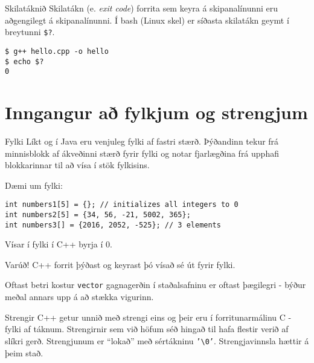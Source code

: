 \documentclass[handout]{beamer}
\begin{document}
\begin{frame}[fragile]{Skilatáknið}
Skilatákn (e. \emph{exit code}) forrita sem keyra á skipanalínunni eru aðgengilegt á skipanalínunni. Í bash (Linux skel) er síðasta skilatákn geymt í breytunni \texttt{\$?}.

\begin{verbatim}
$ g++ hello.cpp -o hello
$ echo $?
0
\end{verbatim}
\end{frame}

\section{Inngangur að fylkjum og strengjum}

\begin{frame}[fragile]{Fylki}
Líkt og í Java eru venjuleg fylki af fastri stærð. Þýðandinn tekur frá minnisblokk af ákveðinni stærð fyrir fylki og notar fjarlægðina frá upphafi blokkarinnar til að vísa í stök fylkisins.

Dæmi um fylki:
\begin{verbatim}
int numbers1[5] = {}; // initializes all integers to 0
int numbers2[5] = {34, 56, -21, 5002, 365};
int numbers3[] = {2016, 2052, -525}; // 3 elements
\end{verbatim}
Vísar í fylki í C++ byrja í 0.

\end{frame}

\begin{frame}{Varúð!}
C++ forrit þýðast og keyrast þó vísað sé út fyrir fylki.
\end{frame}

\begin{frame}[fragile]{Oftast betri kostur}
\texttt{vector} gagnagerðin í staðalsafninu er oftast þægilegri - býður meðal annars upp á að stækka vigurinn.
\end{frame}

\begin{frame}{Strengir}
C++ getur unnið með strengi eins og þeir eru í forritunarmálinu C - fylki af táknum. Strengirnir sem við höfum séð hingað til hafa flestir verið af slíkri gerð.
Strengjunum er ``lokað'' með sértákninu \texttt{'\textbackslash0'}. Strengjavinnsla hættir á þeim stað.
\end{frame}
\end{document}
